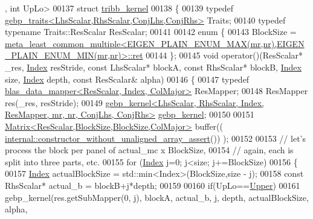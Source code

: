 \begin{DoxyCode}
      , \textcolor{keywordtype}{int} UpLo>
00137 \textcolor{keyword}{struct }\hyperlink{struct_eigen_1_1internal_1_1tribb__kernel}{tribb\_kernel}
00138 \{
00139   \textcolor{keyword}{typedef} \hyperlink{class_eigen_1_1internal_1_1gebp__traits}{gebp\_traits<LhsScalar,RhsScalar,ConjLhs,ConjRhs>} 
      Traits;
00140   \textcolor{keyword}{typedef} \textcolor{keyword}{typename} Traits::ResScalar ResScalar;
00141 
00142   \textcolor{keyword}{enum} \{
00143     BlockSize  = 
      \hyperlink{struct_eigen_1_1internal_1_1meta__least__common__multiple}{meta\_least\_common\_multiple<EIGEN\_PLAIN\_ENUM\_MAX(mr,nr),EIGEN\_PLAIN\_ENUM\_MIN(mr,nr)>::ret}
00144   \};
00145   \textcolor{keywordtype}{void} operator()(ResScalar* \_res, \hyperlink{namespace_eigen_a62e77e0933482dafde8fe197d9a2cfde}{Index} resStride, \textcolor{keyword}{const} LhsScalar* blockA, \textcolor{keyword}{const} RhsScalar* blockB, 
      \hyperlink{namespace_eigen_a62e77e0933482dafde8fe197d9a2cfde}{Index} size, \hyperlink{namespace_eigen_a62e77e0933482dafde8fe197d9a2cfde}{Index} depth, \textcolor{keyword}{const} ResScalar& alpha)
00146   \{
00147     \textcolor{keyword}{typedef} \hyperlink{class_eigen_1_1internal_1_1blas__data__mapper}{blas\_data\_mapper<ResScalar, Index, ColMajor>} 
      ResMapper;
00148     ResMapper res(\_res, resStride);
00149     
      \hyperlink{struct_eigen_1_1internal_1_1gebp__kernel}{gebp\_kernel<LhsScalar, RhsScalar, Index, ResMapper, mr, nr, ConjLhs, ConjRhs>}
       \hyperlink{struct_eigen_1_1internal_1_1gebp__kernel}{gebp\_kernel};
00150 
00151     \hyperlink{group___core___module_class_eigen_1_1_matrix}{Matrix<ResScalar,BlockSize,BlockSize,ColMajor>} buffer((
      \hyperlink{struct_eigen_1_1internal_1_1constructor__without__unaligned__array__assert}{internal::constructor\_without\_unaligned\_array\_assert}())
      );
00152 
00153     \textcolor{comment}{// let's process the block per panel of actual\_mc x BlockSize,}
00154     \textcolor{comment}{// again, each is split into three parts, etc.}
00155     \textcolor{keywordflow}{for} (\hyperlink{namespace_eigen_a62e77e0933482dafde8fe197d9a2cfde}{Index} j=0; j<size; j+=BlockSize)
00156     \{
00157       \hyperlink{namespace_eigen_a62e77e0933482dafde8fe197d9a2cfde}{Index} actualBlockSize = std::min<Index>(BlockSize,size - j);
00158       \textcolor{keyword}{const} RhsScalar* actual\_b = blockB+j*depth;
00159 
00160       \textcolor{keywordflow}{if}(UpLo==\hyperlink{group__enums_gga39e3366ff5554d731e7dc8bb642f83cda6bcb58be3b8b8ec84859ce0c5ac0aaec}{Upper})
00161         gebp\_kernel(res.getSubMapper(0, j), blockA, actual\_b, j, depth, actualBlockSize, alpha,

\end{DoxyCode}

